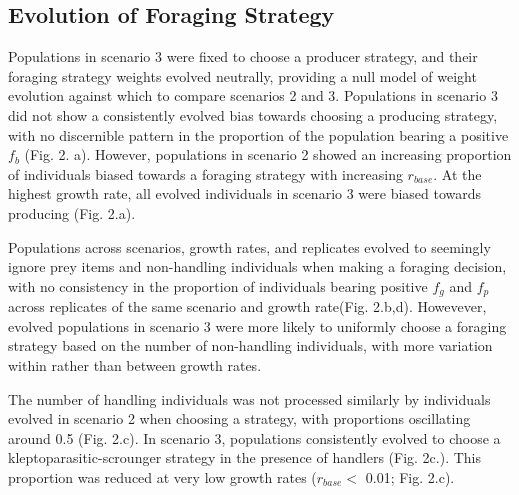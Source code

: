 \documentclass[11pt]{article}
\begin{document}
\subsection*{Evolution of Foraging Strategy}

Populations in scenario 3 were fixed to choose a producer strategy, and their foraging strategy weights evolved neutrally, providing a null model of weight evolution against which to compare scenarios 2 and 3.
Populations in scenario 3 did not show a consistently evolved bias towards choosing a producing strategy, with no discernible pattern in the proportion of the population bearing a positive $f_b$ (Fig. 2. a).
However, populations in scenario 2 showed an increasing proportion of individuals biased towards a foraging strategy with increasing $r_{base}$.
At the highest growth rate, all evolved individuals in scenario 3 were biased towards producing (Fig. 2.a).

Populations across scenarios, growth rates, and replicates evolved to seemingly ignore prey items and non-handling individuals when making a foraging decision, with no consistency in the proportion of individuals bearing positive $f_g$ and $f_p$ across replicates of the same scenario and growth rate(Fig. 2.b,d).
Howevever, evolved populations in scenario 3 were more likely to uniformly choose a foraging strategy based on the number of non-handling individuals, with more variation within rather than between growth rates.

The number of handling individuals was not processed similarly by individuals evolved in scenario 2 when choosing a strategy, with proportions oscillating around 0.5 (Fig. 2.c).
In scenario 3, populations consistently evolved to choose a kleptoparasitic-scrounger strategy in the presence of handlers (Fig. 2c.).
This proportion was reduced at very low growth rates ($r_{base} <$ 0.01; Fig. 2.c).
\end{document}
